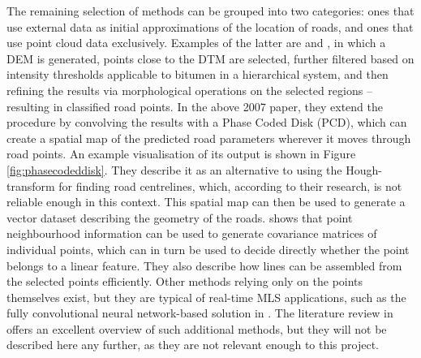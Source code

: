 The remaining selection of methods can be grouped into two categories: ones that use external data as initial approximations of the location of roads, and ones that use point cloud data exclusively.  Examples of the latter are \cite{clode_etal_2004} and \cite{clode_etal_2007}, in which a DEM is generated, points close to the DTM are selected, further filtered based on intensity thresholds applicable to bitumen in a hierarchical system, and then refining the results via morphological operations on the selected regions – resulting in classified road points. In the above 2007 paper, they extend the procedure by convolving the results with a Phase Coded Disk (PCD), which can create a spatial map of the predicted road parameters wherever it moves through road points. An example visualisation of its output is shown in Figure \ref{fig:phasecodeddisk}. They describe it as an alternative to using the Hough-transform for finding road centrelines, which, according to their research, is not reliable enough in this context. This spatial map can then be used to generate a vector dataset describing the geometry of the roads. \cite{gross_thoennessen_2006} shows that point neighbourhood information can be used to generate covariance matrices of individual points, which can in turn be used to decide directly whether the point belongs to a linear feature. They also describe how lines can be assembled from the selected points efficiently. Other methods relying only on the points themselves exist, but they are typical of real-time MLS applications, such as the fully convolutional neural network-based solution in \cite{caltagirone_etal_2017}. The literature review in \cite{yang_etal_2013} offers an excellent overview of such additional methods, but they will not be described here any further, as they are not relevant enough to this project.

